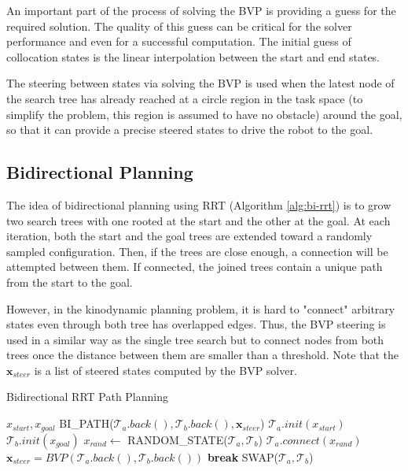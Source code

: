 \documentclass[11pt, conference]{IEEEtran}
\begin{document}
An important part of the process of solving the BVP is providing a guess for the required solution. The quality of this guess can be critical for the solver performance and even for a successful computation.
The initial guess of collocation states is the linear interpolation between the start and end states.

The steering between states via solving the BVP is used when the latest node of the search tree has already reached at a circle region in the task space (to simplify the problem, this region is assumed to have no obstacle) around the goal, so that it can provide a precise steered states to drive the robot to the goal.

\subsection{Bidirectional Planning}

The idea of bidirectional planning using RRT (Algorithm \ref{alg:bi-rrt}) is to grow two search trees with one rooted at the start and the other at the goal\cite{kuffner2000rrt}. At each iteration, both the start and the goal trees are extended toward a randomly sampled configuration. Then, if the trees are close enough, a connection will be attempted between them. If connected, the joined trees contain a unique path from the start to the goal.

However, in the kinodynamic planning problem, it is hard to "connect" arbitrary states even through both tree has overlapped edges. Thus, the BVP steering is used in a similar way as the single tree search but to connect nodes from both trees once the distance between them are smaller than a threshold\cite{lavalle2006planning}. Note that the $\mathbf{x}_{steer}$ is a list of steered states computed by the BVP solver.

\begin{algorithm}[htb]
    \caption{Bidirectional RRT Path Planning}
    \label{alg:bi-rrt}
    \begin{algorithmic}
    \Require $x_{start}, x_{goal}$
    \Ensure BI\_PATH($\mathcal{T}_a.back(), \mathcal{T}_b.back(), \mathbf{x}_{steer}$)
    \State $\mathcal{T}_a.init(x_{start})$
    \State $\mathcal{T}_b.init(x_{goal})$
        \State $x_{rand} \gets $ RANDOM\_STATE($\mathcal{T}_a, \mathcal{T}_b$)
        \State $\mathcal{T}_a.connect(x_{rand})$
            \State $\mathbf{x}_{steer} = BVP(\mathcal{T}_a.back(), \mathcal{T}_b.back())$
            \State \textbf{break}
        \EndIf
        \State SWAP($\mathcal{T}_a, \mathcal{T}_b$)
    \EndFor
    \end{algorithmic}
\end{algorithm}
\end{document}
